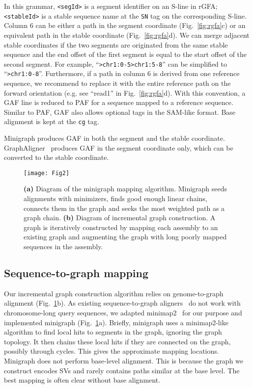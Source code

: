 \documentclass[twocolumn]{bmcart}%
\begin{document}
{\flushleft
In this grammar, {\tt <segId>} is a segment identifier on an S-line in rGFA;
{\tt <stableId>} is a stable sequence name at the {\tt SN} tag on the
corresponding S-line. Column 6 can be either a path in the segment coordinate
(Fig.~\ref{fig:rgfa}c) or an equivalent path in the stable coordinate
(Fig.~\ref{fig:rgfa}d). We can merge adjacent stable coordinates if the two
segments are originated from the same stable sequence and the end offset of the
first segment is equal to the start offset of the second segment. For example,
``{\tt >chr1:0-5>chr1:5-8}'' can be simplified to ``{\tt >chr1:0-8}''.
Furthermore, if a path in column 6 is derived from one reference sequence, we
recommend to replace it with the entire reference path on the forward
orientation (e.g. see ``read1'' in Fig.~\ref{fig:rgfa}d). With this convention,
a GAF line is reduced to PAF for a sequence mapped to a reference sequence.
Similar to PAF, GAF also allows optional tags in the SAM-like format. Base
alignment is kept at the {\tt cg} tag.}

Minigraph produces GAF in both the segment and the stable coordinate.
GraphAligner~\cite{Rautiainen810812} produces GAF in the segment coordinate
only, which can be converted to the stable coordinate.

\begin{figure}[t]
\texttt{[image: Fig2]}
\caption{ {\bf (a)} Diagram of the minigraph
  mapping algorithm. Minigraph seeds alignments with minimizers, finds good
  enough linear chains, connects them in the graph and seeks the most weighted
  path as a graph chain. {\bf (b)} Diagram of incremental graph construction. A
  graph is iteratively constructed by mapping each assembly to an existing
  graph and augmenting the graph with long poorly mapped sequences in the
  assembly.}\label{fig:mg}
\end{figure}

\subsection*{Sequence-to-graph mapping}

Our incremental graph construction algorithm relies on genome-to-graph
alignment (Fig.~\ref{fig:mg}b). As existing sequence-to-graph
aligners~\cite{Garrison:2018aa,Rautiainen810812} do not work with
chromosome-long query sequences, we adapted minimap2~\cite{Li:2018ab} for our
purpose and implemented minigraph (Fig.~\ref{fig:mg}a). Briefly, minigraph uses
a minimap2-like algorithm to find local hits to segments in the graph, ignoring
the graph topology. It then chains these local hits if they are connected on
the graph, possibly through cycles. This gives the approximate mapping locations. Minigraph does not
perform base-level alignment. This is because the graph we construct encodes
SVs and rarely contains paths similar at the base level. The best mapping is
often clear without base alignment.
\end{document}
